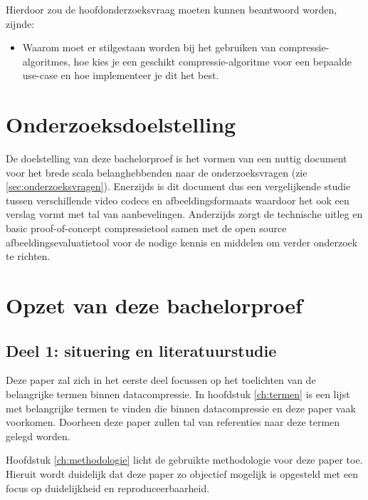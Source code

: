 Hierdoor zou de hoofdonderzoeksvraag moeten kunnen beantwoord worden, zijnde:
\begin{itemize}
	\item Waarom moet er stilgestaan worden bij het gebruiken van \glspl{compressie-algoritme}, hoe kies je een geschikt \gls{compressie-algoritme} voor een bepaalde \gls{use-case} en hoe implementeer je dit het best.
\end{itemize}

\section{Onderzoeksdoelstelling}
\label{sec:onderzoeksdoelstelling}

De doelstelling van deze bachelorproef is het vormen van een nuttig document voor het brede scala belanghebbenden naar de onderzoeksvragen (zie \ref{sec:onderzoeksvragen}). Enerzijds is dit document dus een vergelijkende studie tussen verschillende video \glspl{codec} en \glspl{afbeeldingsformaat} waardoor het ook een verslag vormt met tal van aanbevelingen. Anderzijds zorgt de technische uitleg en basic proof-of-concept \gls{compressietool} samen met de open source \gls{afbeeldingsevaluatietool} voor de nodige kennis en middelen om verder onderzoek te richten.


\section{Opzet van deze bachelorproef}
\label{sec:opzet-bachelorproef}
\subsection{Deel 1: situering en literatuurstudie}
\label{sec:opzet-bachelorproef-deel-1}

Deze paper zal zich in het eerste deel focussen op het toelichten van de belangrijke termen binnen \gls{datacompressie}. In hoofdstuk \ref{ch:termen} is een lijst met belangrijke termen te vinden die binnen \gls{datacompressie} en deze paper vaak voorkomen. Doorheen deze paper zullen tal van referenties naar deze termen gelegd worden. 

Hoofdstuk \ref{ch:methodologie} licht de gebruikte methodologie voor deze paper toe. Hieruit wordt duidelijk dat deze paper zo objectief mogelijk is opgesteld met een focus op duidelijkheid en reproduceerbaarheid.

